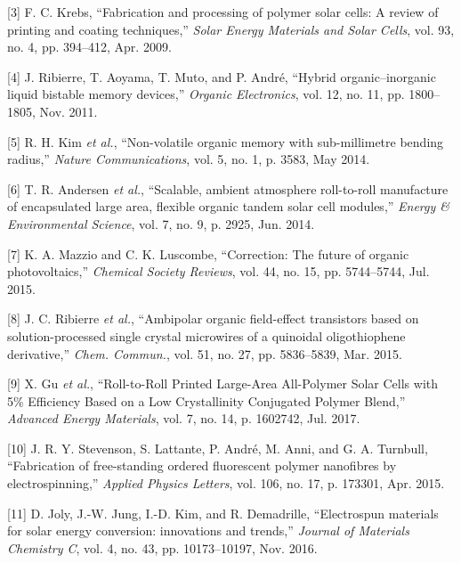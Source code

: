 \documentclass[]{article}
\begin{document}
\leavevmode\hypertarget{ref-Krebs2009}{}%
{[}3{]} F. C. Krebs, ``Fabrication and processing of polymer solar cells: A review of printing and coating techniques,'' \emph{Solar Energy Materials and Solar Cells}, vol. 93, no. 4, pp. 394--412, Apr. 2009.

\leavevmode\hypertarget{ref-Ribierre2011}{}%
{[}4{]} J. Ribierre, T. Aoyama, T. Muto, and P. André, ``Hybrid organic--inorganic liquid bistable memory devices,'' \emph{Organic Electronics}, vol. 12, no. 11, pp. 1800--1805, Nov. 2011.

\leavevmode\hypertarget{ref-Kim2014}{}%
{[}5{]} R. H. Kim \emph{et al.}, ``Non-volatile organic memory with sub-millimetre bending radius,'' \emph{Nature Communications}, vol. 5, no. 1, p. 3583, May 2014.

\leavevmode\hypertarget{ref-Andersen2014}{}%
{[}6{]} T. R. Andersen \emph{et al.}, ``Scalable, ambient atmosphere roll-to-roll manufacture of encapsulated large area, flexible organic tandem solar cell modules,'' \emph{Energy \& Environmental Science}, vol. 7, no. 9, p. 2925, Jun. 2014.

\leavevmode\hypertarget{ref-Mazzio2015}{}%
{[}7{]} K. A. Mazzio and C. K. Luscombe, ``Correction: The future of organic photovoltaics,'' \emph{Chemical Society Reviews}, vol. 44, no. 15, pp. 5744--5744, Jul. 2015.

\leavevmode\hypertarget{ref-Ribierre2015}{}%
{[}8{]} J. C. Ribierre \emph{et al.}, ``Ambipolar organic field-effect transistors based on solution-processed single crystal microwires of a quinoidal oligothiophene derivative,'' \emph{Chem. Commun.}, vol. 51, no. 27, pp. 5836--5839, Mar. 2015.

\leavevmode\hypertarget{ref-Gu2017}{}%
{[}9{]} X. Gu \emph{et al.}, ``Roll-to-Roll Printed Large-Area All-Polymer Solar Cells with 5\% Efficiency Based on a Low Crystallinity Conjugated Polymer Blend,'' \emph{Advanced Energy Materials}, vol. 7, no. 14, p. 1602742, Jul. 2017.

\leavevmode\hypertarget{ref-Stevenson2015}{}%
{[}10{]} J. R. Y. Stevenson, S. Lattante, P. André, M. Anni, and G. A. Turnbull, ``Fabrication of free-standing ordered fluorescent polymer nanofibres by electrospinning,'' \emph{Applied Physics Letters}, vol. 106, no. 17, p. 173301, Apr. 2015.

\leavevmode\hypertarget{ref-Joly2016}{}%
{[}11{]} D. Joly, J.-W. Jung, I.-D. Kim, and R. Demadrille, ``Electrospun materials for solar energy conversion: innovations and trends,'' \emph{Journal of Materials Chemistry C}, vol. 4, no. 43, pp. 10173--10197, Nov. 2016.
\end{document}
